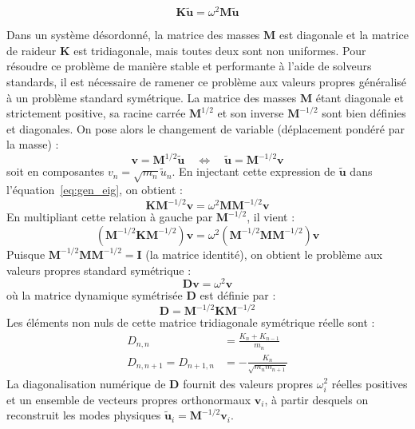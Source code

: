 \documentclass[11pt, a4paper, twoside]{article}
\begin{document}
\begin{equation}\label{eq:gen_eig}
    \mathbf{K} \tilde{\mathbf{u}} = \omega^2 \mathbf{M} \tilde{\mathbf{u}}
\end{equation}

Dans un système désordonné, la matrice des masses $\mathbf{M}$ est diagonale et la matrice de raideur $\mathbf{K}$ est tridiagonale, mais toutes deux sont non uniformes. Pour résoudre ce problème de manière stable et performante à l'aide de solveurs standards, il est nécessaire de ramener ce problème aux valeurs propres généralisé à un problème standard symétrique. La matrice des masses $\mathbf{M}$ étant diagonale et strictement positive, sa racine carrée $\mathbf{M}^{1/2}$ et son inverse $\mathbf{M}^{-1/2}$ sont bien définies et diagonales. On pose alors le changement de variable (déplacement pondéré par la masse) :
\begin{equation*}
    \mathbf{v} = \mathbf{M}^{1/2} \tilde{\mathbf{u}} \quad \Longleftrightarrow \quad \tilde{\mathbf{u}} = \mathbf{M}^{-1/2} \mathbf{v}
\end{equation*}
soit en composantes $v_n = \sqrt{m_n} \tilde{u}_n$. En injectant cette expression de $\tilde{\mathbf{u}}$ dans l'équation~\eqref{eq:gen_eig}, on obtient :
\begin{equation*}
    \mathbf{K} \mathbf{M}^{-1/2} \mathbf{v} = \omega^2 \mathbf{M} \mathbf{M}^{-1/2} \mathbf{v}
\end{equation*}
En multipliant cette relation à gauche par $\mathbf{M}^{-1/2}$, il vient :
\begin{equation*}
    \left(\mathbf{M}^{-1/2} \mathbf{K} \mathbf{M}^{-1/2}\right) \mathbf{v} = \omega^2 \left(\mathbf{M}^{-1/2} \mathbf{M} \mathbf{M}^{-1/2}\right) \mathbf{v}
\end{equation*}
Puisque $\mathbf{M}^{-1/2} \mathbf{M} \mathbf{M}^{-1/2} = \mathbf{I}$ (la matrice identité), on obtient le problème aux valeurs propres standard symétrique :
\begin{equation}\label{eq:sym_eig}
    \mathbf{D} \mathbf{v} = \omega^2 \mathbf{v}
\end{equation}
où la matrice dynamique symétrisée $\mathbf{D}$ est définie par :
\begin{equation*}
    \mathbf{D} = \mathbf{M}^{-1/2} \mathbf{K} \mathbf{M}^{-1/2}
\end{equation*}
Les éléments non nuls de cette matrice tridiagonale symétrique réelle sont :
\begin{align*}
    D_{n,n} &= \frac{K_n + K_{n-1}}{m_n} \\
    D_{n, n+1} = D_{n+1, n} &= -\frac{K_n}{\sqrt{m_n m_{n+1}}}
\end{align*}
La diagonalisation numérique de $\mathbf{D}$ fournit des valeurs propres $\omega_i^2$ réelles positives et un ensemble de vecteurs propres orthonormaux $\mathbf{v}_i$, à partir desquels on reconstruit les modes physiques $\tilde{\mathbf{u}}_i = \mathbf{M}^{-1/2} \mathbf{v}_i$.
\end{document}
